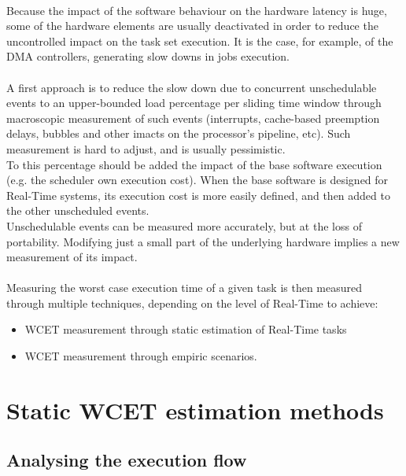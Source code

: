 \paragraph{}
Because the impact of the software behaviour on the hardware latency is huge, some of the hardware
elements are usually deactivated in order to reduce the uncontrolled impact on the task set
execution. It is the case, for example, of the DMA controllers, generating slow downs in jobs
execution.

\paragraph{}
A first approach is to reduce the slow down due to concurrent unschedulable events to an
upper-bounded load percentage per sliding time window through macroscopic measurement of such events
(interrupts, cache-based preemption delays, bubbles and other imacts on the processor's pipeline, etc).
Such measurement is hard to adjust, and is usually pessimistic.\\
To this percentage should be added the impact of the base software execution (e.g. the scheduler
own execution cost). When the base software is designed for Real-Time systems, its execution cost
is more easily defined, and then added to the other unscheduled events.\\
Unschedulable events can be measured more accurately, but at the loss of portability. Modifying
just a small part of the underlying hardware implies a new measurement of its impact.

\paragraph{}
Measuring the worst case execution time of a given task is then measured through multiple
techniques, depending on the level of Real-Time to achieve:
\begin{itemize}
\item WCET measurement through static estimation of Real-Time tasks
\item WCET measurement through empiric scenarios.
\end{itemize}

\section{Static WCET estimation methods}

\subsection{Analysing the execution flow}

